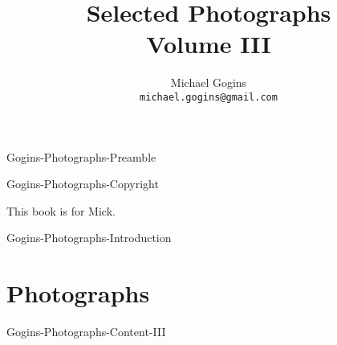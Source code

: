  {Gogins-Photographs-Preamble}

	\frontmatter
	\onecolumn
	
	\title{Selected Photographs \\ Volume III}
	\author{Michael Gogins \\ \texttt{michael.gogins@gmail.com}}
	
	\maketitle
	
	 {Gogins-Photographs-Copyright}
	
	\clearpage
	\begin{centering}
		This book is for Mick.
	\end{centering}
	
	\tableofcontents
	\listoffigures
	
	\mainmatter
	
	\pagestyle{headings}
	\twocolumn
	
	 {Gogins-Photographs-Introduction}	
	
	\chapter{Photographs}
	
	 {Gogins-Photographs-Content-III}
	


